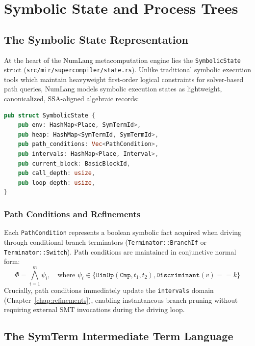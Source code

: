 \chapter{Symbolic State and Process Trees}
\label{chap:symbolic_state}

\section{The Symbolic State Representation}
\label{sec:symbolic_state:struct}

At the heart of the NumLang metacomputation engine lies the \texttt{SymbolicState} struct (\texttt{src/mir/supercompiler/state.rs}). Unlike traditional symbolic execution tools which maintain heavyweight first-order logical constraints for solver-based path queries, NumLang models symbolic execution states as lightweight, canonicalized, SSA-aligned algebraic records:

\begin{lstlisting}[language=Rust, caption={The SymbolicState structure in NumLang.}]
pub struct SymbolicState {
    pub env: HashMap<Place, SymTermId>,
    pub heap: HashMap<SymTermId, SymTermId>,
    pub path_conditions: Vec<PathCondition>,
    pub intervals: HashMap<Place, Interval>,
    pub current_block: BasicBlockId,
    pub call_depth: usize,
    pub loop_depth: usize,
}
\end{lstlisting}

\subsection{Path Conditions and Refinements}
Each \texttt{PathCondition} represents a boolean symbolic fact acquired when driving through conditional branch terminators (\texttt{Terminator::BranchIf} or \texttt{Terminator::Switch}). Path conditions are maintained in conjunctive normal form:
\begin{equation}
\Phi = \bigwedge_{i=1}^m \psi_i, \quad \text{where } \psi_i \in \{\mathtt{BinOp}(\mathtt{Cmp}, t_1, t_2), \mathtt{Discriminant}(v) == k\}
\end{equation}
Crucially, path conditions immediately update the \texttt{intervals} domain (Chapter~\ref{chap:refinements}), enabling instantaneous branch pruning without requiring external SMT invocations during the driving loop.

\section{The SymTerm Intermediate Term Language}
\label{sec:symbolic_state:term_lang}

